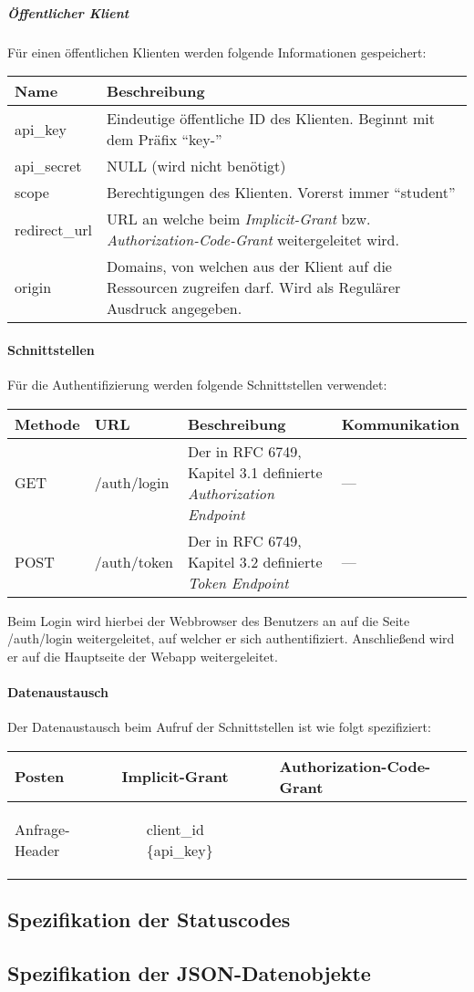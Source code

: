 \subparagraph{Öffentlicher Klient}
Für einen öffentlichen Klienten werden folgende Informationen gespeichert:\\
\begin{tabularx}{\textwidth}{@{} | X | X | @{}}
	\hline
	\textbf{Name} & \textbf{Beschreibung}\\ \hline \hline
	api\_key & Eindeutige öffentliche ID des Klienten. Beginnt mit dem Präfix \enquote{key-} \\ \hline
	api\_secret & NULL (wird nicht benötigt) \\ \hline
	scope & Berechtigungen des Klienten. Vorerst immer \enquote{student} \\ \hline
	redirect\_url & URL an welche beim \textit{Implicit-Grant} bzw. \textit{Authorization-Code-Grant} weitergeleitet wird. \\ \hline
	origin & Domains, von welchen aus der Klient auf die Ressourcen zugreifen darf. Wird als Regulärer Ausdruck angegeben. \\
	\hline
\end{tabularx}
\paragraph{Schnittstellen}
Für die Authentifizierung werden folgende Schnittstellen verwendet:
\begin{table}
\begin{tabularx}{\textwidth}{@{} | X | X | X | X | @{}}
	\hline
	\textbf{Methode} & \textbf{URL} & \textbf{Beschreibung} & \textbf{Kommunikation} \\ \hline \hline
	GET & /auth/login & Der in RFC 6749, Kapitel 3.1 definierte \textit{Authorization Endpoint} & --- \\ \hline
	POST & /auth/token & Der in RFC 6749, Kapitel 3.2 definierte \textit{Token Endpoint} & --- \\ \hline
\end{tabularx}
\end{table}
Beim Login wird hierbei der Webbrowser des Benutzers an auf die Seite /auth/login weitergeleitet, auf welcher er sich authentifiziert. Anschließend wird er auf die Hauptseite der Webapp weitergeleitet.
\paragraph{Datenaustausch}
Der Datenaustausch beim Aufruf der Schnittstellen ist wie folgt spezifiziert:\\
\begin{tabularx}{\textwidth}{@{} | X | X | X | @{}}
	\hline
	\textbf{Posten} & \textbf{Implicit-Grant} & \textbf{Authorization-Code-Grant} \\ \hline
	Anfrage-Header &
	\begin{itemize}
		\item[]
		\item[client\_id] \{api\_key\}
	\end{itemize} & \\
\end{tabularx}
\subsection{Spezifikation der Statuscodes}

\subsection{Spezifikation der JSON-Datenobjekte}
